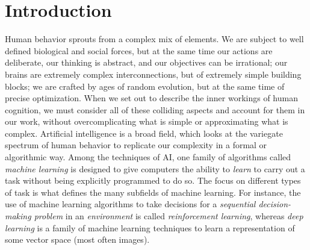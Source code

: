 \chapter{Introduction}
\label{ch1_intro}
\thispagestyle{empty}

\vspace{0.5cm}
 
Human behavior sprouts from a complex mix of elements. We are subject to 
well defined biological and social forces, but at the same time our actions are 
deliberate, our thinking is abstract, and our objectives can be irrational; 
our brains are extremely complex interconnections, but of extremely simple 
building blocks; we are crafted by ages of random evolution, but at the same time 
of precise optimization. 
When we set out to describe the inner workings of human cognition, we must 
consider all of these colliding aspects and account for them in our work, 
without overcomplicating what is simple or approximating what is complex.
Artificial intelligence is a broad field, which looks at the variegate spectrum 
of human behavior to replicate our complexity in a formal or algorithmic way. 
Among the techniques of AI, one family of algorithms called \textit{machine
learning} is designed to give computers the ability to \textit{learn} to carry 
out a task without being explicitly programmed to do so. The focus on different
types of task is what defines the many subfields of machine learning.
For instance, the use of machine learning algorithms to take decisions for a 
\textit{sequential decision-making problem} in an \textit{environment} is 
called \textit{reinforcement learning}, whereas \textit{deep learning} is a 
family of machine learning techniques to learn a representation of some vector
space (most often images).

